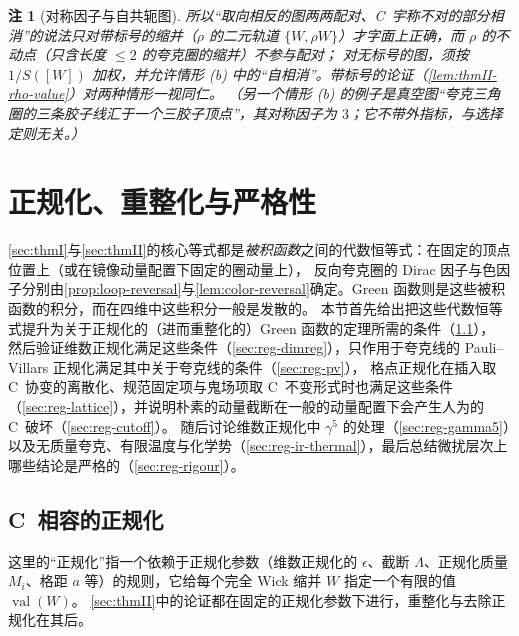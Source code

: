 \documentclass[UTF8,a4paper,11pt,fontset=fandol]{ctexart}
\theoremstyle{cplain}
\theoremstyle{cdefinition}
\theoremstyle{cremark}
\newtheorem{remark}[theorem]{注}
\numberwithin{equation}{section}
\begin{document}
\begin{remark}[对称因子与自共轭图]
所以“取向相反的图两两配对、C~宇称不对的部分相消”的说法只对带标号的缩并（$\rho$ 的二元轨道 $\{W,\rho W\}$）才字面上正确，而 $\rho$ 的不动点（只含长度 $\le2$ 的夸克圈的缩并）不参与配对；
对无标号的图，须按 $1/S([W])$ 加权，并允许情形 (b) 中的“自相消”。带标号的论证（\cref{lem:thmII-rho-value}）对两种情形一视同仁。
（另一个情形 (b) 的例子是真空图“夸克三角圈的三条胶子线汇于一个三胶子顶点”，其对称因子为 $3$；它不带外指标，与选择定则无关。）
\end{remark}

\section{正规化、重整化与严格性}\label{sec:regularization}

\cref{sec:thmI}与\cref{sec:thmII}的核心等式都是\emph{被积函数}之间的代数恒等式：在固定的顶点位置上（或在镜像动量配置下固定的圈动量上），
反向夸克圈的 Dirac 因子与色因子分别由\cref{prop:loop-reversal}与\cref{lem:color-reversal}确定。Green 函数则是这些被积函数的积分，而在四维中这些积分一般是发散的。
本节首先给出把这些代数恒等式提升为关于正规化的（进而重整化的）Green 函数的定理所需的条件（\cref{sec:reg-hypotheses}），
然后验证维数正规化满足这些条件（\cref{sec:reg-dimreg}），只作用于夸克线的 Pauli--Villars 正规化满足其中关于夸克线的条件（\cref{sec:reg-pv}），
格点正规化在插入取 C~协变的离散化、规范固定项与鬼场项取 C~不变形式时也满足这些条件（\cref{sec:reg-lattice}），并说明朴素的动量截断在一般的动量配置下会产生人为的 C~破坏（\cref{sec:reg-cutoff}）。
随后讨论维数正规化中 $\gamma^5$ 的处理（\cref{sec:reg-gamma5}）以及无质量夸克、有限温度与化学势（\cref{sec:reg-ir-thermal}），最后总结微扰层次上哪些结论是严格的（\cref{sec:reg-rigour}）。

\subsection{C~相容的正规化}\label{sec:reg-hypotheses}

这里的“正规化”指一个依赖于正规化参数（维数正规化的 $\epsilon$、截断 $\Lambda$、正规化质量 $M_i$、格距 $a$ 等）的规则，它给每个完全 Wick 缩并 $W$ 指定一个有限的值 $\operatorname{val}(W)$。
\cref{sec:thmII}中的论证都在固定的正规化参数下进行，重整化与去除正规化在其后。
\end{document}
